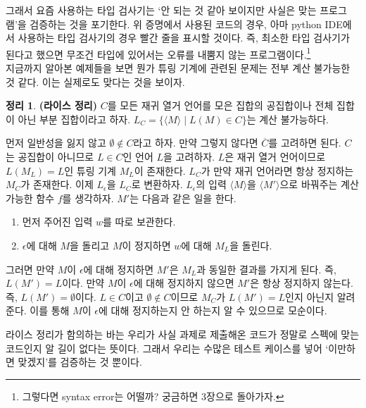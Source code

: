 \documentclass[b5paper, 11pt]{book}
\theoremstyle{definition}
\newtheorem{thm}[defn]{정리}
\newenvironment{pf*}{\pushQED{\qed}\pf}
{\popQED\endpf}
\begin{document}
그래서 요즘 사용하는 타입 검사기는 `안 되는 것 같아 보이지만 사실은 맞는 프로그램'을 검증하는 것을 포기한다. 위 증명에서 사용된 코드의 경우, 아마 python IDE에서 사용하는 타입 검사기의 경우 빨간 줄을 표시할 것이다. 즉, 최소한 타입 검사기가 된다고 했으면 무조건 타입에 있어서는 오류를 내뿜지 않는 프로그램이다.\footnote{그렇다면 syntax error는 어떨까? 궁금하면 3장으로 돌아가자.} \\
지금까지 알아본 예제들을 보면 뭔가 튜링 기계에 관련된 문제는 전부 계산 불가능한 것 같다. 이는 실제로도 맞다는 것을 보이자.
\begin{thm}
    \textbf{(라이스 정리)} $C$를 모든 재귀 열거 언어를 모은 집합의 공집합이나 
    전체 집합이 아닌 부분 집합이라고 하자. $L_C = \{ \langle M \rangle \; \vert 
    \; L(M) \in C\}$는 계산 불가능하다. 
\end{thm}
\begin{pf*}
    먼저 일반성을 잃지 않고 $\emptyset \notin C$라고 하자. 만약 그렇지 않다면 $\overline{C}$를 고려하면 된다. $C$는 공집합이 아니므로 $L\in C$인 언어 $L$을 고려하자. $L$은 재귀 열거 언어이므로 $L(M_L) = L$인 튜링 기계 $M_L$이 존재한다. $L_C$가 만약 재귀 언어라면 항상 정지하는 $M_C$가 존재한다. 이제 $L_\epsilon$을 $L_C$로 변환하자. $L_\epsilon$의 입력  $\langle M \rangle$을 $\langle M' \rangle$으로 바꿔주는 계산 가능한 함수 $f$를 생각하자. $M'$는 다음과 같은 일을 한다.
    \begin{enumerate}
        \item 먼저 주어진 입력 $w$를 따로 보관한다.
        \item $\epsilon$에 대해 $M$을 돌리고 $M$이 정지하면 $w$에 대해 $M_L$을 돌린다.
    \end{enumerate}
    그러면 만약 $M$이 $\epsilon$에 대해 정지하면 $M'$은 $M_L$과 동일한 결과를 가지게 된다. 즉, $L(M') = L$이다. 만약 $M$이 $\epsilon$에 대해 정지하지 않으면 $M'$은 항상 정지하지 않는다. 즉, $L(M') = \emptyset$이다. $L \in C$이고 $\emptyset \notin C$이므로 $M_C$가 $L(M') = L$인지 아닌지 알려준다. 이를 통해 $M$이 $\epsilon$에 대해 정지하는지 안 하는지 알 수 있으므로 모순이다.
\end{pf*}
라이스 정리가 함의하는 바는 우리가 사실 과제로 제출해온 코드가 정말로 스펙에 맞는 코드인지 알 길이 없다는 뜻이다. 그래서 우리는 수많은 테스트 케이스를 넣어 `이만하면 맞겠지'를 검증하는 것 뿐이다.
\end{document}
